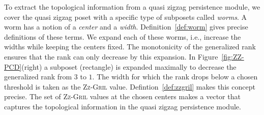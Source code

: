 \documentclass{article}
\newcommand{\zzgril}{\textsc{Zz-Gril}}
\newcommand{\qzzmod}{quasi zigzag persistence module}
\newcommand{\RKG}{\mathsf{rk}}
\newcommand{\vp}{\mathbf{p}}
\renewcommand{\varprojlim}{\mathsf{lim}}
\renewcommand{\varinjlim}{\mathsf{colim}}
\theoremstyle{plain}
\theoremstyle{definition}
\newtheorem{definition}[theorem]{Definition}
\theoremstyle{remark}
\begin{document}


 

To extract the topological information from a \qzzmod{}, we cover the quasi zigzag poset with a specific type of subposets called \emph{worms}. A worm has a notion of a \emph{center} and a \emph{width}. Definition~\ref{def:worm} gives precise definitions of these terms. We expand each of these worms, i.e., increase the widths while keeping the centers fixed. The monotonicity of the generalized rank ensures that the rank can only decrease by this expansion. In Figure~\ref{fig:ZZ-PCD}(right) a subposet (rectangle) is expanded maximally to decrease the generalized rank from $3$ to $1$. The width for which the rank drops below a chosen threshold is taken as the \zzgril{} value. Defintion~\ref{def:zzgril} makes this concept precise. The set of \zzgril{} values at the chosen centers makes a vector that captures the topological information in the \qzzmod.
\end{document}

